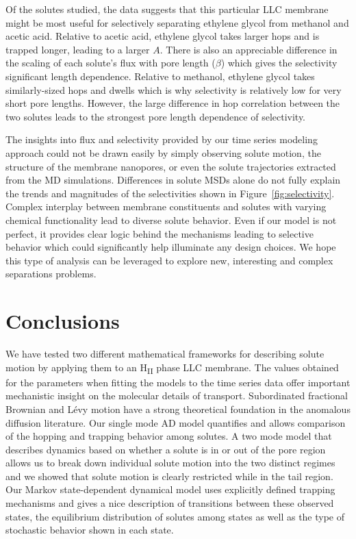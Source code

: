 \documentclass[journal=ancac3,manuscript=article,layout=twocolumn]{achemso}
\begin{document}
  Of the solutes studied, the data suggests that this particular LLC membrane 
  might be most useful for selectively separating ethylene glycol from methanol
  and acetic acid. Relative to acetic acid, ethylene glycol takes larger hops 
  and is trapped longer, leading to a larger $A$. There is also an appreciable 
  difference in the scaling of each solute's flux with pore length ($\beta$) 
  which gives the selectivity significant length dependence. Relative to methanol,
  ethylene glycol takes similarly-sized hops and dwells which is why selectivity
  is relatively low for very short pore lengths. However, the large difference in
  hop correlation between the two solutes leads to the strongest pore length 
  dependence of selectivity. 
  
  The insights into flux and selectivity provided by our time series modeling
  approach could not be drawn easily by simply observing solute motion, the
  structure of the membrane nanopores, or even the solute trajectories
  extracted from the MD simulations. Differences in solute MSDs alone do not
  fully explain the trends and magnitudes of the selectivities shown in
  Figure~\ref{fig:selectivity}. Complex interplay between membrane
  constituents and solutes with varying chemical functionality lead to diverse
  solute behavior. Even if our model is not perfect, it provides clear logic
  behind the mechanisms leading to selective behavior which could significantly
  help illuminate any design choices. We hope this type of analysis can be 
  leveraged to explore new, interesting and complex separations problems.
  
  \section{Conclusions}
  
  We have tested two different mathematical frameworks for describing solute
  motion by applying them to an H\textsubscript{II} phase LLC membrane. The
  values obtained for the parameters when fitting the models to the time series
  data offer important mechanistic insight on the molecular details of
  transport. Subordinated fractional Brownian and L\'evy motion have a strong
  theoretical foundation in the anomalous diffusion literature. Our single mode
  AD model quantifies and allows comparison of the hopping and trapping behavior
  among solutes. A two mode model that describes dynamics based on whether a
  solute is in or out of the pore region allows us to break down individual
  solute motion into the two distinct regimes and we showed that solute motion
  is clearly restricted while in the tail region. Our Markov state-dependent
  dynamical model uses explicitly defined trapping mechanisms and gives a nice
  description of transitions between these observed states, the equilibrium
  distribution of solutes among states as well as the type of stochastic
  behavior shown in each state. 
  
\end{document}
